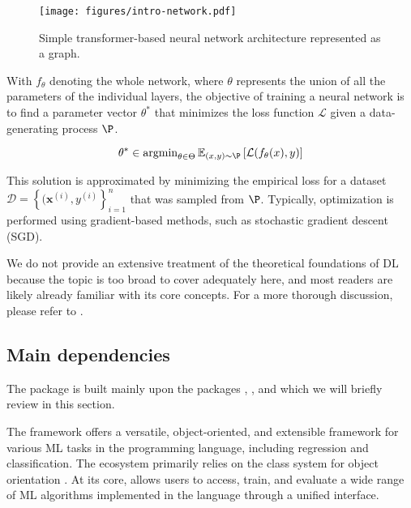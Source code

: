 \documentclass[article]{jss}
\theoremstyle{definition}
\begin{document}
\begin{figure}[h]
    \centering
    \texttt{[image: figures/intro-network.pdf]}
    \caption{Simple transformer-based neural network architecture represented as a graph.}
    \label{fig:intro-network}
\end{figure}

With $f_\theta$ denoting the whole network, where $\theta$ represents the union of all the parameters of the individual layers, the objective of training a neural network is to find a parameter vector $\theta^*$ that minimizes the loss function $\mathcal{L}$ given a data-generating process $\P$.

\begin{equation}
\theta^* \in \operatorname{argmin}_{\theta \in \Theta} \mathbb{E}_{(x, y) \sim \P} \left[ \mathcal{L}(f_{\theta}(x), y) \right]
\end{equation}

This solution is approximated by minimizing the empirical loss for a dataset $\mathcal{D} = \left\{ (\mathbf{x}^{(i)}, y^{(i)} \right\}_{i=1}^n$ that was sampled from $\P$.
Typically, optimization is performed using gradient-based methods, such as stochastic gradient descent (SGD).

We do not provide an extensive treatment of the theoretical foundations of DL because the topic is too broad to cover adequately here, and most readers are likely already familiar with its core concepts. For a more thorough discussion, please refer to \cite{bishop2023deep}.

\subsection{Main dependencies}

The  \rlang{} package is built mainly upon the \rlang{} packages  \citep{ref-mlr32019},  \citep{ref-mlr3pipelines2021}, and  \citep{ref-torch2025} which we will briefly review in this section.

The  framework offers a versatile, object-oriented, and extensible framework for various ML tasks in the \rlang{} programming language, including regression and classification.
The ecosystem primarily relies on the  class system for object orientation \citep{ref-r6chang}.
At its core,  allows users to access, train, and evaluate a wide range of ML algorithms implemented in the \rlang{} language through a unified interface.
\end{document}
